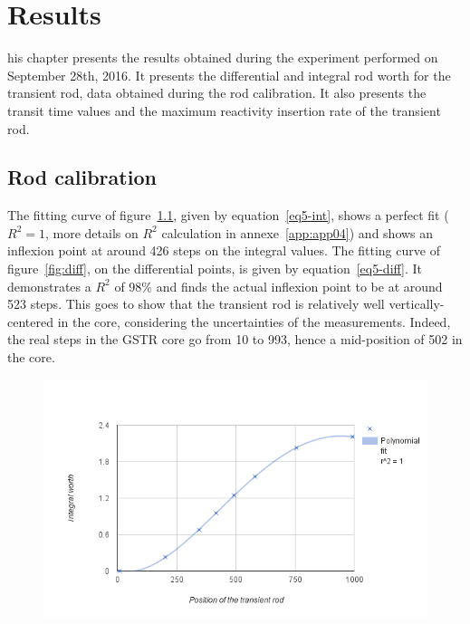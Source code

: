 %
%
\let\textcircled=\pgftextcircled
\chapter{Results}
\label{chap:result}

his chapter presents the results obtained during the experiment performed on September 28th, 2016. It presents the differential and integral rod worth for the transient rod, data obtained during the rod calibration. It also presents the transit time values and the maximum reactivity insertion rate of the transient rod.

\section{Rod calibration}
The fitting curve of figure~\ref{fig:int}, given by equation~\ref{eq5-int}, shows a perfect fit ($R^2 = 1$, more details on $R^2$ calculation in annexe~\ref{app:app04}) and shows an inflexion point at around 426 steps on the integral values. The fitting curve of figure~\ref{fig:diff}, on the differential points, is given by equation~\ref{eq5-diff}. It demonstrates a $R^2$ of 98\% and finds the actual inflexion point to be at around 523 steps. This goes to show that the transient rod is relatively well vertically-centered in the core, considering the uncertainties of the measurements. Indeed, the real steps in the GSTR core go from 10 to 993, hence a mid-position of 502 in the core.

\begin{figure}[t!]
	\centering
	\includegraphics[height=0.4\textheight]{fig02/int.png}
	\label{fig:int}
\end{figure}

